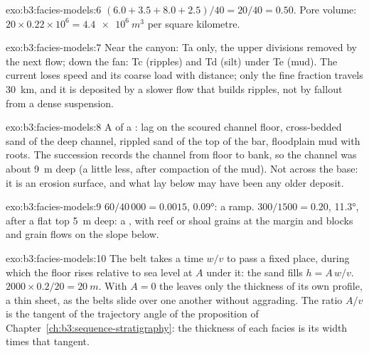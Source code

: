 \begin{solution}{exo:b3:facies-models:6}
$(6.0 + 3.5 + 8.0 + 2.5)/40 = 20/40 = 0.50$. Pore volume: $20\times0.22
\times10^6 = \qty{4.4e6}{m^3}$ per square kilometre.
\end{solution}

\begin{solution}{exo:b3:facies-models:7}
Near the canyon: Ta only, the upper divisions removed by the next flow; down
the fan: Tc (ripples) and Td (silt) under Te (mud). The current loses speed
and its coarse load with distance; only the fine fraction travels
\qty{30}{km}, and it is deposited by a slower flow that builds ripples, not
by fallout from a dense suspension.
\end{solution}

\begin{solution}{exo:b3:facies-models:8}
A  of a : lag on the scoured channel floor,
cross-bedded sand of the deep channel, rippled sand of the top of the bar,
floodplain mud with roots. The succession records the channel from floor to
bank, so the channel was about \qty{9}{m} deep (a little less, after
compaction of the mud). Not across the base: it is an erosion surface, and
what lay below may have been any older deposit.
\end{solution}

\begin{solution}{exo:b3:facies-models:9}
$60/40\,000 = 0.0015$, \ang{0.09}: a ramp. $300/1500 = 0.20$, \ang{11.3},
after a flat top \qty{5}{m} deep: a , with reef or shoal grains
at the margin and blocks and grain flows on the slope below.
\end{solution}

\begin{solution}{exo:b3:facies-models:10}
The belt takes a time $w/v$ to pass a fixed place, during which the floor
rises relative to sea level at $A$ under it: the sand fills $h = A\,w/v$.
$2000\times0.2/20 = \qty{20}{m}$. With $A = 0$ the  leaves only
the thickness of its own profile, a thin sheet, as the belts slide over one
another without aggrading. The ratio $A/v$ is the tangent of the trajectory
angle of the proposition of Chapter~\ref{ch:b3:sequence-stratigraphy}: the
thickness of each facies is its width times that tangent.
\end{solution}

